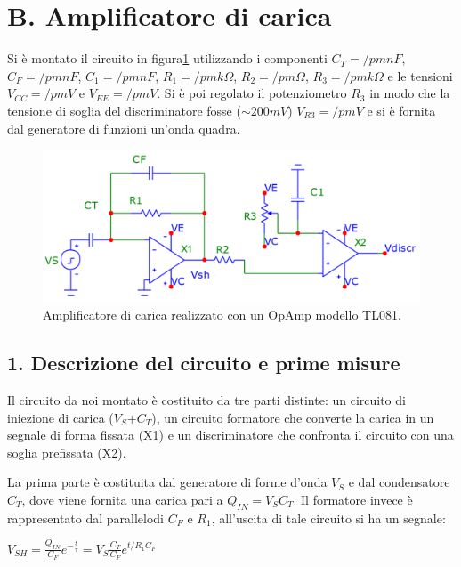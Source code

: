 \documentclass[10pt,a4paper]{article}
\begin{document}
\section*{B. Amplificatore di carica}

Si è montato il circuito in figura\ref{circuito2} utilizzando i componenti $C_T = /pm nF$, $C_F = /pm nF$, $C_1 = /pm nF$, $R_1 = /pm k \Omega$, $R_2 = /pm \Omega$, $R_3 = /pm k \Omega$ e le tensioni $V_{CC} = /pm V$ e $V_{EE} = /pm V$. Si è poi regolato il potenziometro $R_3$ in modo che la tensione di soglia del discriminatore fosse ($\sim 200mV$) $V_{R3} = /pm V$ e si è fornita dal generatore di funzioni un'onda quadra.\\
\begin{figure}[h]
\centering
\includegraphics[scale=0.5]{amplificatoreCarica.png}
\caption{Amplificatore di carica realizzato con un OpAmp modello TL081.\label{circuito2}}
\end{figure}

\subsection*{1. Descrizione del circuito e prime misure}
Il circuito da noi montato è costituito da tre parti distinte: un circuito di iniezione di carica ($V_S$+$C_T$), un circuito formatore che converte la carica in un segnale di forma fissata (X1) e un discriminatore che confronta il circuito con una soglia prefissata (X2).


La prima parte è costituita dal generatore di forme d'onda $V_S$ e dal condensatore $C_T$, dove viene fornita una carica pari a $Q_{IN}=V_S C_T$. Il formatore invece è rappresentato dal parallelodi $C_F$ e $R_1$, all'uscita di tale circuito si ha un segnale:\\
\begin{center}
$V_{SH}=\frac{Q_{IN}}{C_F} e^{-\frac{t}{\tau}} = V_S \frac{C_T}{C_F} e^{t/R_1 C_F}$\\
\end{center}\\
\end{document}
